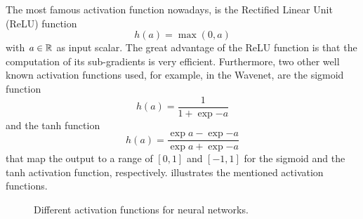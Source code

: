 The most famous activation function nowadays, is the Rectified Linear Unit (ReLU) \cite{Zeiler2013_relu} function
\begin{equation}\label{eq:nn_theory_relu}
  h(a) = \max{(0, a)}
\end{equation}
with $a \in \mathbb{R}$ as input scalar.
The great advantage of the ReLU function is that the computation of its sub-gradients is very efficient.
Furthermore, two other well known activation functions used, for example, in the Wavenet, are the sigmoid function
\begin{equation}\label{eq:nn_theory_sigmoid}
  h(a) = \frac{1}{1 + \exp{-a}}
\end{equation}
and the tanh function
\begin{equation}\label{eq:nn_theory_tanh}
  h(a) = \frac{\exp{a} - \exp{-a}}{\exp{a} + \exp{-a}}
\end{equation}
that map the output to a range of $[0, 1]$ and $[-1, 1]$ for the sigmoid and the tanh activation function, respectively.
 illustrates the mentioned activation functions.
\begin{figure}[!ht]
  \centering
    \quad
    \quad
  \caption{Different activation functions for neural networks.}
  \label{fig:nn_theory_activation}
\end{figure}
\FloatBarrier
\noindent


